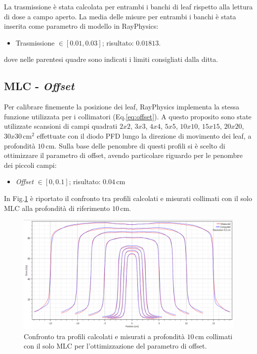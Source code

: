 La trasmissione è stata calcolata per entrambi i banchi di leaf rispetto alla lettura di dose a campo aperto. La media delle misure per entrambi i banchi è stata inserita come parametro di modello in RayPhysics:
\begin{itemize}
\item Trasmissione $\in [0.01,0.03]$; risultato: $0.01813$.
\end{itemize}
dove nelle parentesi quadre sono indicati i limiti consigliati dalla ditta.


\subsection{MLC - \textit{Offset}}
Per calibrare finemente la posizione dei leaf, RayPhysics implementa la stessa funzione utilizzata per i collimatori (Eq.\ref{eq:offset}). A questo proposito sono state utilizzate scansioni di campi quadrati $2x2$, $3x3$, $4x4$, $5x5$, $10x10$, $15x15$, $20x20$, $30x30\,$cm$^2$ effettuate con il diodo PFD lungo la direzione di movimento dei leaf, a profondità $10\,$cm. Sulla base delle penombre di questi profili si è scelto di ottimizzare il parametro di offset, avendo particolare riguardo per le penombre dei piccoli campi:
\begin{itemize}
\item \textit{Offset} $\in [0,0.1]$; risultato: $0.04\,$cm
\end{itemize}
In Fig.\ref{fig:MLC_Offset} è riportato il confronto tra profili calcolati e misurati collimati con il solo MLC alla profondità di riferimento $10\,$cm.
\begin{figure}
\centering
\includegraphics[width=\textwidth]{./cap2/MLC_Offset.png}
\caption{Confronto tra profili calcolati e misurati a profondità $10\,$cm collimati con il solo MLC per l'ottimizzazione del parametro di offset.}
\label{fig:MLC_Offset}
\end{figure}

